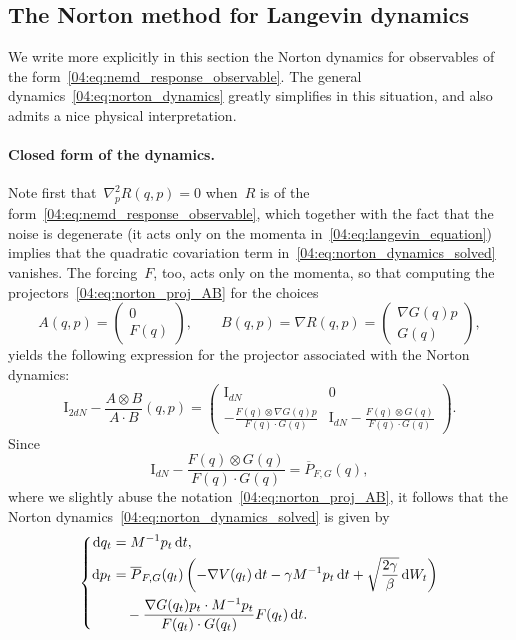 \subsection{The Norton method for Langevin dynamics}\label{04:subsec:langevin_norton}

We write more explicitly in this section the Norton dynamics for observables of the form~\eqref{04:eq:nemd_response_observable}. The general dynamics~\eqref{04:eq:norton_dynamics} greatly simplifies in this situation, and also admits a nice physical interpretation.

\paragraph{Closed form of the dynamics.}
Note first that~$\nabla^2_p R(q,p)=0$ when~$R$ is of the form~\eqref{04:eq:nemd_response_observable}, which together with the fact that the noise is degenerate (it acts only on the momenta in~\eqref{04:eq:langevin_equation}) implies that the quadratic covariation term in~\eqref{04:eq:norton_dynamics_solved} vanishes.
The forcing~$F$, too, acts only on the momenta, so that computing the projectors~\eqref{04:eq:norton_proj_AB} for the choices
\[A(q,p) = \begin{pmatrix}0\\ F(q)\end{pmatrix},\qquad B(q,p)=\nabla R(q,p) = \begin{pmatrix}\nabla G(q) p \\ G(q)\end{pmatrix},\]
yields the following expression for the projector associated with the Norton dynamics:
\[\mathrm{I}_{2dN}-\frac{A\otimes B}{A\cdot B}(q,p)=\begin{pmatrix}\displaystyle{\mathrm{I}_{dN}} & 0 \\ \displaystyle{-\frac{F(q)\otimes \nabla G(q)p}{F(q)\cdot G(q)}} & \displaystyle{\mathrm{I}_{dN}-\frac{F(q)\otimes G(q)}{F(q)\cdot G(q)}}\end{pmatrix}.\]
Since
\[\mathrm{I}_{dN}-\frac{F(q)\otimes G(q)}{F(q)\cdot G(q)}=\overline{P}_{F,G}(q),\]
where we slightly abuse the notation~\eqref{04:eq:norton_proj_AB}, it follows that the Norton dynamics~\eqref{04:eq:norton_dynamics_solved} is given by
\begin{equation}
    \label{04:eq:norton_langevin}
    \left\{
    \begin{aligned}
        \mathrm{d} q_t &= M^{-1}p_t\,\mathrm{d} t,\\
        \mathrm{d} p_t &= \overline{P}_{F,G}(q_t)\left(-\nabla V(q_t)\,\mathrm{d} t -\gamma M^{-1}p_t \,\mathrm{d} t +\sqrt{\frac{2\gamma}{\beta}}\,\mathrm{d} W_t\right) \\ &\quad-\frac{\nabla G(q_t)p_t\cdot M^{-1}p_t}{F(q_t)\cdot G(q_t)}F(q_t)\,\mathrm{d} t.
    \end{aligned}
    \right.
\end{equation}
